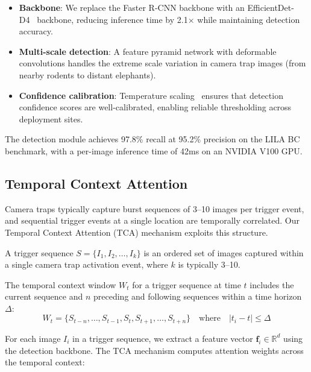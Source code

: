 \begin{itemize}[leftmargin=*]
    \item \textbf{Backbone}: We replace the Faster R-CNN backbone with an EfficientDet-D4~\cite{tan2020} backbone, reducing inference time by 2.1$\times$ while maintaining detection accuracy.
    \item \textbf{Multi-scale detection}: A feature pyramid network with deformable convolutions handles the extreme scale variation in camera trap images (from nearby rodents to distant elephants).
    \item \textbf{Confidence calibration}: Temperature scaling~\cite{guo2017} ensures that detection confidence scores are well-calibrated, enabling reliable thresholding across deployment sites.
\end{itemize}

The detection module achieves 97.8\% recall at 95.2\% precision on the LILA BC benchmark, with a per-image inference time of 42ms on an NVIDIA V100 GPU.

\subsection{Temporal Context Attention}

Camera traps typically capture burst sequences of 3--10 images per trigger event, and sequential trigger events at a single location are temporally correlated. Our Temporal Context Attention (TCA) mechanism exploits this structure.

\begin{definition}
A trigger sequence $S = \{I_1, I_2, \ldots, I_k\}$ is an ordered set of images captured within a single camera trap activation event, where $k$ is typically 3--10.
\end{definition}

\begin{definition}
The temporal context window $W_t$ for a trigger sequence at time $t$ includes the current sequence and $n$ preceding and following sequences within a time horizon $\Delta$:
\begin{equation}
W_t = \{S_{t-n}, \ldots, S_{t-1}, S_t, S_{t+1}, \ldots, S_{t+n}\} \quad \text{where} \quad |t_i - t| \leq \Delta
\end{equation}
\end{definition}

For each image $I_i$ in a trigger sequence, we extract a feature vector $\mathbf{f}_i \in \mathbb{R}^d$ using the detection backbone. The TCA mechanism computes attention weights across the temporal context:

